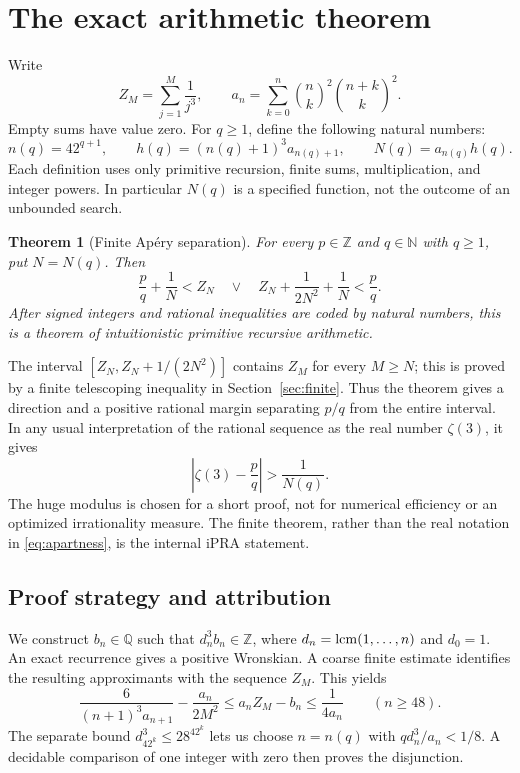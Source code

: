 \documentclass[11pt]{article}
\newtheorem{theorem}{Theorem}[section]
\theoremstyle{definition}\newtheorem{definition}[theorem]{Definition}
\theoremstyle{remark}\newtheorem{remark}[theorem]{Remark}
\newcommand{\N}{\mathbb N}\newcommand{\Z}{\mathbb Z}\newcommand{\Q}{\mathbb Q}
\newcommand{\abs}[1]{\left|#1\right|}\newcommand{\floor}[1]{\left\lfloor#1\right\rfloor}
\begin{document}
\section{The exact arithmetic theorem}
Write
\begin{equation}\label{eq:partials}
 Z_M=\sum_{j=1}^{M}\frac1{j^3},\qquad
 a_n=\sum_{k=0}^{n}\binom nk^2\binom{n+k}{k}^2.
\end{equation}
Empty sums have value zero. For $q\ge1$, define the following natural numbers:
\begin{equation}\label{eq:modulus}
 n(q)=42^{q+1},\qquad
 h(q)=(n(q)+1)^3a_{n(q)+1},\qquad
 N(q)=a_{n(q)}h(q).
\end{equation}
Each definition uses only primitive recursion, finite sums, multiplication,
and integer powers. In particular $N(q)$ is a specified function, not the
outcome of an unbounded search.

\begin{theorem}[Finite Ap\'ery separation]\label{thm:main}
For every $p\in\Z$ and $q\in\N$ with $q\ge1$, put $N=N(q)$. Then
\begin{equation}\label{eq:main}
 \boxed{\quad
 \frac pq+\frac1N<Z_N
 \quad\lor\quad
 Z_N+\frac1{2N^2}+\frac1N<\frac pq.
 \quad}
\end{equation}
After signed integers and rational inequalities are coded by natural numbers,
this is a theorem of intuitionistic primitive recursive arithmetic.
\end{theorem}

The interval $[Z_N,Z_N+1/(2N^2)]$ contains $Z_M$ for every $M\ge N$;
this is proved by a finite telescoping inequality in Section~\ref{sec:finite}.
Thus the theorem gives a direction and a positive rational margin separating
$p/q$ from the entire interval. In any usual interpretation of the rational
sequence as the real number $\zeta(3)$, it gives
\begin{equation}\label{eq:apartness}
 \abs{\zeta(3)-\frac pq}>\frac1{N(q)}.
\end{equation}
The huge modulus is chosen for a short proof, not for numerical efficiency or
an optimized irrationality measure. The finite theorem, rather than the real
notation in \eqref{eq:apartness}, is the internal iPRA statement.

\subsection{Proof strategy and attribution}
We construct $b_n\in\Q$ such that $d_n^3b_n\in\Z$, where
$d_n=\operatorname{lcm}(1,\ldots,n)$ and $d_0=1$. An exact recurrence gives a positive
Wronskian. A coarse finite estimate identifies the resulting approximants
with the sequence $Z_M$. This yields
\[
 \frac6{(n+1)^3a_{n+1}}-\frac{a_n}{2M^2}
 \le a_nZ_M-b_n\le\frac1{4a_n}\qquad(n\ge48).
\]
The separate bound $d_{42^k}^3\le28^{42^k}$ lets us choose $n=n(q)$ with
$qd_n^3/a_n<1/8$. A decidable comparison of one integer with zero then proves
the disjunction.
\end{document}
